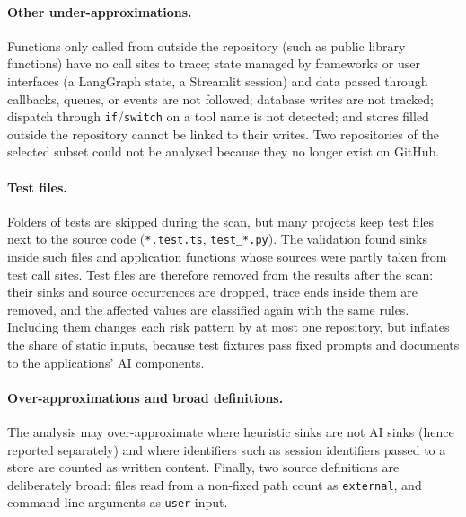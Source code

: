 \paragraph{Other under-approximations.} Functions only called from outside the repository (such as public library functions) have no call sites to trace; state managed by frameworks or user interfaces (a LangGraph state, a Streamlit session) and data passed through callbacks, queues, or events are not followed; database writes are not tracked; dispatch through \texttt{if}/\texttt{switch} on a tool name is not detected; and stores filled outside the repository cannot be linked to their writes. Two repositories of the selected subset could not be analysed because they no longer exist on GitHub.

\paragraph{Test files.} Folders of tests are skipped during the scan, but many projects keep test files next to the source code (\texttt{*.test.ts}, \texttt{test\_*.py}). The validation found sinks inside such files and application functions whose sources were partly taken from test call sites. Test files are therefore removed from the results after the scan: their sinks and source occurrences are dropped, trace ends inside them are removed, and the affected values are classified again with the same rules. Including them changes each risk pattern by at most one repository, but inflates the share of static inputs, because test fixtures pass fixed prompts and documents to the applications' AI components.

\paragraph{Over-approximations and broad definitions.} The analysis may over-approximate where heuristic sinks are not AI sinks (hence reported separately) and where identifiers such as session identifiers passed to a store are counted as written content. Finally, two source definitions are deliberately broad: files read from a non-fixed path count as \texttt{external}, and command-line arguments as \texttt{user} input.